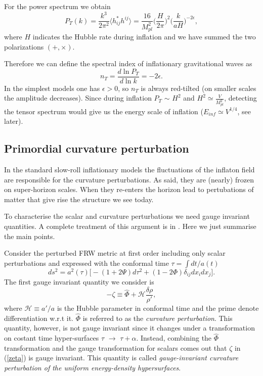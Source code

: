 \documentclass[11pt,a4paper,twoside]{book}
\begin{document}
For the power spectrum we obtain
\begin{equation}
\label{spectumGW}
P_{T}(k)=\frac{k^{3}}{2\pi^{2}}\langle h^{*}_{ij}h^{ij}\rangle=\frac{16}{M_{pl}^{2}}\Big(\frac{H}{2\pi}\Big )^{2}\Big (\frac{k}{aH}\Big)^{-2\epsilon},
\end{equation}   
where $ H $ indicates the Hubble rate during inflation and we have summed the two polarizations $ (+,\times) $.

Therefore we can define the spectral index of inflationary gravitational waves as
\begin{equation}
n_{T} = \frac{d \ln P_{T}}{d \ln k} = -2\epsilon.
\end{equation}
In the simplest models one has $ \epsilon > 0 $, so $ n_{T} $ is always red-tilted (on smaller scales the amplitude decreases).
Since during inflation $P_{T} $ $\sim$ $ H^{2} $ and $ H^{2} \simeq \frac{V}{M^{2}_{pl}} $, detecting the tensor spectrum would give us the energy scale of inflation ($ E_{inf} \simeq V^{1/4} $, see later). 

\subsection{Primordial curvature perturbation}
In the standard slow-roll inflationary models the fluctuations of the inflaton field are responsible for the curvature perturbations.
 As said, they are (nearly) frozen on super-horizon scales. When they re-enters the horizon lead to pertubations of matter that give rise the structure we see today.
 
To characterise the scalar and curvature perturbations we need gauge invariant quantities.
A complete treatment of this argument is in \cite{NonGauss:Intro}. Here we just summarise the main points.

Consider the perturbed FRW metric at first order including only scalar perturbations and expressed with the conformal time $ \tau=\int dt/a(t) $
\begin{equation}
\label{metricPerturbed}
ds^{2}=a^{2}(\tau) \big [-(1+2\Psi)d\tau^{2} + (1-2\Phi)\delta_{ij}dx_{i}dx_{j} \big].
\end{equation}
The first gauge invariant quantity we consider is
\begin{equation}
	\label{zeta}
	-\zeta \equiv \hat{\Phi} + \mathcal{H}\frac{\delta \rho}{\rho'},
\end{equation}
where $\mathcal{H} \equiv a'/a$ is the Hubble parameter in conformal time and the prime denote differentiation w.r.t it. $\hat{\Phi}$ is referred to as the \textit{curvature perturbation}. This quantity, however, is not gauge invariant since it changes under a transformation on costant time hyper-surfaces $\tau$ $\rightarrow$ $ \tau + \alpha $. Instead, combining the $\hat{\Phi}$ transformation and the gauge transformation for scalars comes out that $\zeta$ in (\ref{zeta}) is gauge invariant. This quantity is called \textit{gauge-invariant curvature perturbation of the uniform energy-density hypersurfaces}.
\end{document}
